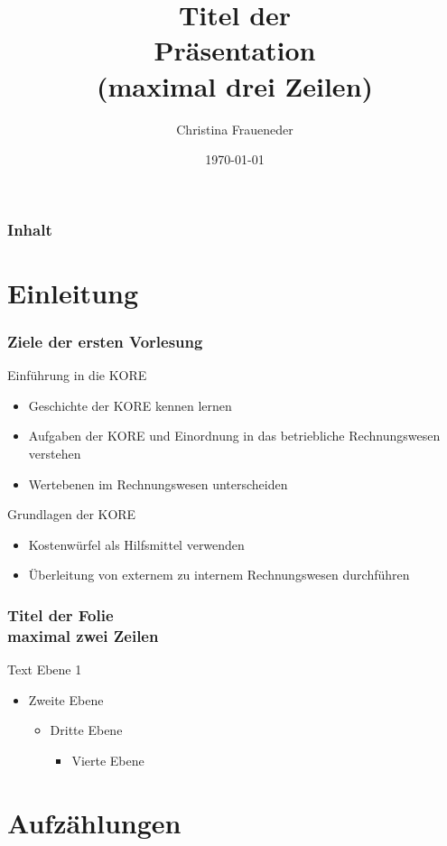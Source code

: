 \documentclass{beamer}
\title[Thema oder andere gleichbleibende Information]{Titel der \\Präsentation\\(maximal drei Zeilen)}
\author{Christina Fraueneder}
\date{\today}
\institute[Büro des Rektorates]{Büro des Rektorates\\Zweite Zeile}
\begin{document}
\titleframe

\begin{frame}
  \frametitle{Inhalt}
  \tableofcontents%
\end{frame}


\section{Einleitung}
\begin{frame}
	\frametitle{Ziele der ersten Vorlesung}
	Einführung in die KORE
	\begin{itemize}
		\item Geschichte der KORE kennen lernen
		\item Aufgaben der KORE und Einordnung in das betriebliche Rechnungswesen verstehen
		\item Wertebenen im Rechnungswesen unterscheiden
	\end{itemize}
	
	Grundlagen der KORE
	\begin{itemize}
		\item Kostenwürfel als Hilfsmittel verwenden
		\item Überleitung von externem zu internem Rechnungswesen durchführen
	\end{itemize}
\end{frame}

\begin{frame}
	\frametitle{Titel der Folie\\maximal zwei Zeilen}
	Text Ebene 1
	\begin{itemize}
		\item Zweite Ebene
		\begin{itemize}
			\item Dritte Ebene
			\begin{itemize}
				\item Vierte Ebene
			\end{itemize}
		\end{itemize}
	\end{itemize}
\end{frame}

\section{Aufzählungen}
\end{document}
